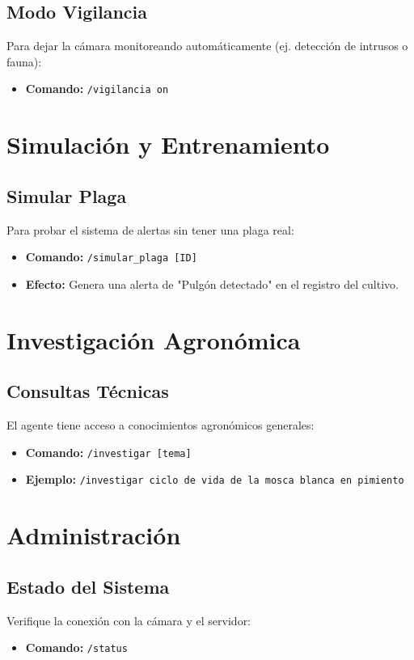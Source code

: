 \documentclass[a4paper,12pt]{article}
\begin{document}
\subsection{Modo Vigilancia}
Para dejar la cámara monitoreando automáticamente (ej. detección de intrusos o fauna):
\begin{itemize}
    \item \textbf{Comando:} \texttt{/vigilancia on}
\end{itemize}

\section{Simulación y Entrenamiento}

\subsection{Simular Plaga}
Para probar el sistema de alertas sin tener una plaga real:
\begin{itemize}
    \item \textbf{Comando:} \texttt{/simular\_plaga [ID]}
    \item \textbf{Efecto:} Genera una alerta de "Pulgón detectado" en el registro del cultivo.
\end{itemize}

\section{Investigación Agronómica}

\subsection{Consultas Técnicas}
El agente tiene acceso a conocimientos agronómicos generales:
\begin{itemize}
    \item \textbf{Comando:} \texttt{/investigar [tema]}
    \item \textbf{Ejemplo:} \texttt{/investigar ciclo de vida de la mosca blanca en pimiento}
\end{itemize}

\section{Administración}

\subsection{Estado del Sistema}
Verifique la conexión con la cámara y el servidor:
\begin{itemize}
    \item \textbf{Comando:} \texttt{/status}
\end{itemize}
\end{document}

